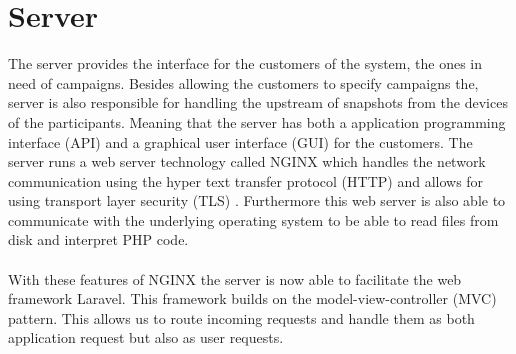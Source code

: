 \section{Server}
The server provides the interface for the customers of the system, the ones in need of campaigns. Besides allowing the customers to specify campaigns the, server is also responsible for handling the upstream of snapshots from the devices of the participants. Meaning that the server has both a application programming interface (API)  and a graphical user interface (GUI)  for the customers. The server runs a web server technology called NGINX which handles the network communication using the hyper text transfer protocol (HTTP)  and allows for using transport layer security (TLS) . Furthermore this web server is also able to communicate with the underlying operating system to be able to read files from disk and interpret PHP code.
\\\\
With these features of NGINX the server is now able to facilitate the web framework Laravel. This framework builds on the model-view-controller (MVC) pattern. This allows us to route incoming requests and handle them as both application request but also as user requests. 


